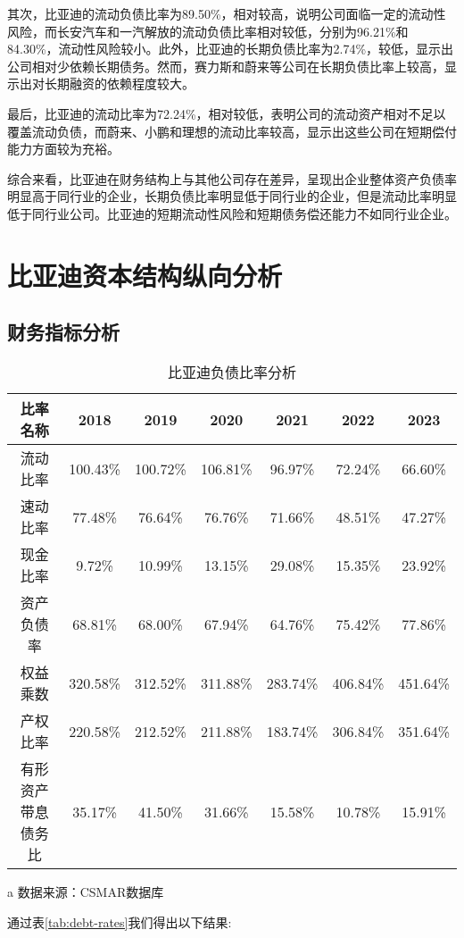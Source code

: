 其次，比亚迪的流动负债比率为89.50\%，相对较高，说明公司面临一定的流动性风险，而长安汽车和一汽解放的流动负债比率相对较低，分别为96.21\%和84.30\%，流动性风险较小。此外，比亚迪的长期负债比率为2.74\%，较低，显示出公司相对少依赖长期债务。然而，赛力斯和蔚来等公司在长期负债比率上较高，显示出对长期融资的依赖程度较大。

最后，比亚迪的流动比率为72.24\%，相对较低，表明公司的流动资产相对不足以覆盖流动负债，而蔚来、小鹏和理想的流动比率较高，显示出这些公司在短期偿付能力方面较为充裕。

综合来看，比亚迪在财务结构上与其他公司存在差异，呈现出企业整体资产负债率明显高于同行业的企业，长期负债比率明显低于同行业的企业，但是流动比率明显低于同行业公司。比亚迪的短期流动性风险和短期债务偿还能力不如同行业企业。
\section{比亚迪资本结构纵向分析}
\subsection{财务指标分析}
\begin{table}
  \centering
  \begin{threeparttable}[c]
    \caption{比亚迪负债比率分析}
    \label{tab:debt-rates}
    \begin{tabular}{ccccccc}
      \toprule
        比率名称 & 2018 & 2019 & 2020 & 2021 & 2022 & 2023 \\ 
      \midrule
        流动比率 & 100.43\% & 100.72\% & 106.81\% & 96.97\% & 72.24\% & 66.60\% \\ 
        速动比率 & 77.48\% & 76.64\% & 76.76\% & 71.66\% & 48.51\% & 47.27\% \\ 
        现金比率 & 9.72\% & 10.99\% & 13.15\% & 29.08\% & 15.35\% & 23.92\% \\ 
        资产负债率 & 68.81\% & 68.00\% & 67.94\% & 64.76\% & 75.42\% & 77.86\% \\
        权益乘数 & 320.58\% & 312.52\% & 311.88\% & 283.74\% & 406.84\% & 451.64\% \\ 
        产权比率 & 220.58\% & 212.52\% & 211.88\% & 183.74\% & 306.84\% & 351.64\% \\ 
        有形资产带息债务比 & 35.17\% & 41.50\% & 31.66\% & 15.58\% & 10.78\% & 15.91\% \\ 
      \bottomrule
    \end{tabular}
    \begin{tablenotes}
      \item [a] 数据来源：CSMAR数据库
    \end{tablenotes}
  \end{threeparttable}
\end{table}
通过表\eqref{tab:debt-rates}我们得出以下结果:

